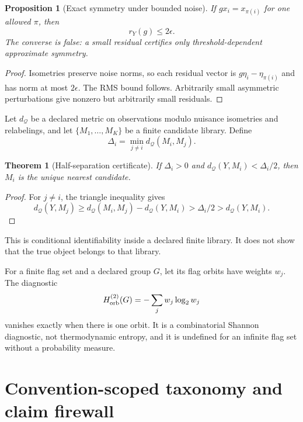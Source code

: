 \documentclass[11pt,a4paper]{article}
\theoremstyle{definition}
\theoremstyle{plain}
\newtheorem{theorem}[definition]{Theorem}
\newtheorem{proposition}[definition]{Proposition}
\theoremstyle{remark}
\newcommand{\Qcal}{\mathcal Q}
\begin{document}
\begin{proposition}[Exact symmetry under bounded noise]
\label{prop:noise}
If \(g x_i=x_{\pi(i)}\) for one allowed \(\pi\), then
\[
r_Y(g)\le2\epsilon.
\]
The converse is false: a small residual certifies only
threshold-dependent approximate symmetry.
\end{proposition}

\begin{proof}
Isometries preserve noise norms, so each residual vector is
\(g\eta_i-\eta_{\pi(i)}\) and has norm at most \(2\epsilon\).
The RMS bound follows.  Arbitrarily small asymmetric perturbations
give nonzero but arbitrarily small residuals.
\end{proof}

Let \(d_{\Qcal}\) be a declared metric on observations modulo nuisance
isometries and relabelings, and let
\(\{M_1,\ldots,M_K\}\) be a finite candidate library.  Define
\[
\Delta_i=\min_{j\ne i}d_{\Qcal}(M_i,M_j).
\]

\begin{theorem}[Half-separation certificate]
\label{thm:separation}
If \(\Delta_i>0\) and
\(d_{\Qcal}(Y,M_i)<\Delta_i/2\), then \(M_i\) is the unique nearest
candidate.
\end{theorem}

\begin{proof}
For \(j\ne i\), the triangle inequality gives
\[
d_{\Qcal}(Y,M_j)\ge
d_{\Qcal}(M_i,M_j)-d_{\Qcal}(Y,M_i)
>\Delta_i/2>d_{\Qcal}(Y,M_i).
\]
\end{proof}

This is conditional identifiability inside a declared finite library.
It does not show that the true object belongs to that library.

For a finite flag set and a declared group \(G\), let its flag orbits
have weights \(w_j\).  The diagnostic
\begin{equation}\label{eq:orbit-entropy}
H_{\rm orb}^{(2)}(G)
=-\sum_jw_j\log_2w_j
\end{equation}
vanishes exactly when there is one orbit.  It is a combinatorial
Shannon diagnostic, not thermodynamic entropy, and it is undefined
for an infinite flag set without a probability measure.

\section{Convention-scoped taxonomy and claim firewall}
\end{document}
